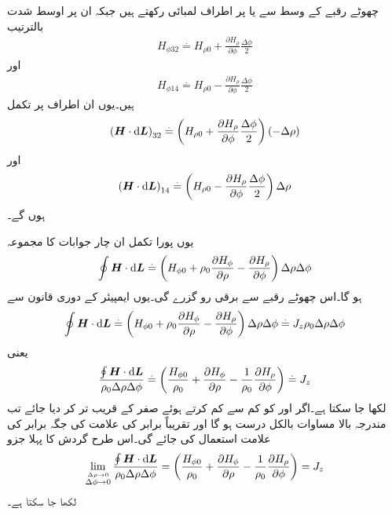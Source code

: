 چھوٹے رقبے کے وسط سے   یا  پر  اطراف
  لمبائی رکھتے ہیں جبکہ ان پر اوسط شدت بالترتیب
\begin{align*}
H_{\phi 32}\overset{.}{=}H_{\rho 0}+\frac{\partial H_\rho}{\partial \phi}\frac{\Delta \phi}{2}
\end{align*}
اور
\begin{align*}
H_{\phi 14}\overset{.}{=}H_{\rho 0}-\frac{\partial H_\rho}{\partial \phi}\frac{\Delta \phi}{2}
\end{align*}
ہیں۔یوں ان اطراف پر تکمل
\begin{align*}
\left(\kvec{H} \cdot \dif \kvec{L}\right)_{32} \overset{.}{=}\left(H_{\rho 0}+\frac{\partial H_\rho}{\partial \phi}\frac{\Delta \phi}{2} \right)\left(-\Delta \rho \right)
\end{align*}
اور
\begin{align*}
\left(\kvec{H} \cdot \dif \kvec{L}\right)_{14} \overset{.}{=}\left(H_{\rho 0}-\frac{\partial H_\rho}{\partial \phi}\frac{\Delta \phi}{2} \right)\Delta \rho
\end{align*}
ہوں گے۔

یوں پورا تکمل ان چار جوابات کا مجموعہ
\begin{align}\label{مساوات_مقناطیسی_نلکی_پہلا_بند_تکمل}
\oint\kvec{H} \cdot \dif \kvec{L}\overset{.}{=}\left(H_{\phi 0} +\rho_0 \frac{\partial H_\phi}{\partial \rho}-\frac{\partial H_\rho}{\partial \phi}\right)\Delta \rho \Delta \phi
\end{align}
ہو گا۔اس چھوٹے رقبے سے  برقی رو گزرے گی۔یوں ایمپیئر کے دوری قانون سے
\begin{align*}
\oint \kvec{H} \cdot \dif \kvec{L}\overset{.}{=}\left(H_{\phi 0} +\rho_0 \frac{\partial H_\phi}{\partial \rho}-\frac{\partial H_\rho}{\partial \phi}\right)\Delta \rho \Delta \phi\overset{.}{=}J_z \rho_0 \Delta \rho \Delta \phi
\end{align*}
یعنی
\begin{align*}
\frac{\oint \kvec{H} \cdot \dif \kvec{L}}{\rho_0 \Delta \rho \Delta \phi}\overset{.}{=}\left(\frac{H_{\phi 0}}{\rho_0} +\frac{\partial H_\phi}{\partial \rho}-\frac{1}{\rho_0}\frac{\partial H_\rho}{\partial \phi}\right)\overset{.}{=}J_z
\end{align*}
لکھا جا سکتا ہے۔اگر  اور  کو کم سے کم کرتے ہوئے صفر کے قریب تر کر دیا جائے تب مندرجہ بالا مساوات بالکل درست ہو گا اور تقریباً برابر کی علامت  کی جگہ برابر کی علامت  استعمال کی جائے گی۔اس طرح گردش کا پہلا جزو 
\begin{align}\label{مساوات_مقناطیسی_رداسی_زیڈ_گردش}
\lim_{\overset{\Delta \rho \to 0}{\Delta \phi \to 0}}\frac{\oint \kvec{H} \cdot \dif \kvec{L}}{\rho_0 \Delta \rho \Delta \phi}=\left(\frac{H_{\phi 0}}{\rho_0} +\frac{\partial H_\phi}{\partial \rho}-\frac{1}{\rho_0}\frac{\partial H_\rho}{\partial \phi}\right)=J_z
\end{align}
لکھا جا سکتا ہے۔

